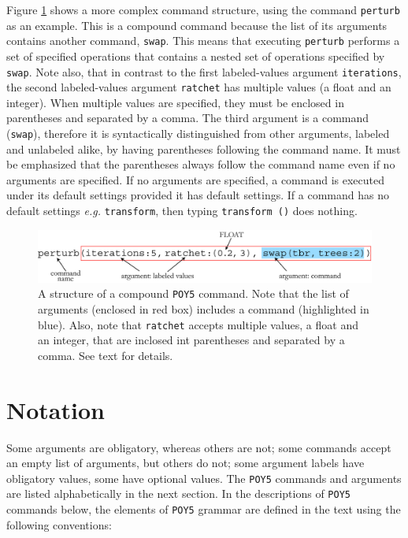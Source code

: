 \documentclass[11pt]{book}
\newcommand{\commandstyle}[1]{\texttt{#1}}
\newcommand{\poycommand}[1]{\commandstyle{#1}}
\newcommand{\poyargument}[1]{\commandstyle{#1}}
\newcommand{\poy}{\commandstyle{POY5}\xspace}
\begin{document}
Figure \ref{compositecommand} shows a more complex command structure, using the command 
\poycommand{perturb} as an example. This is a compound command because the list of its arguments 
contains another command, \poycommand{swap}. This means that executing \poycommand{perturb} 
performs a set of specified operations that contains a nested set of operations specified by \poycommand{swap}. 
Note also, that in contrast to the first labeled-values argument \poyargument{iterations}, the second 
labeled-values argument \poyargument{ratchet} has multiple values (a float and an integer). When 
multiple values are specified, they must be enclosed in parentheses and separated by a comma. The 
third argument is a command (\poycommand{swap}), therefore it is syntactically distinguished from 
other arguments, labeled and unlabeled alike, by having parentheses following the command name. It 
must be emphasized that the parentheses always follow the command name even if no arguments are 
specified. If no arguments are specified, a command is executed under its default settings provided it 
has default settings.  If a command has no default settings \emph{e.g.} \poycommand {transform}, then 
typing \poycommand{transform ()} does nothing. 

\begin{figure}[htbp]
   \centering
   \includegraphics[width=1.0\textwidth]{doc/figures/fig-poycommand2.jpg}
   \caption{A structure of a compound \poy command. Note that the list of arguments
   (enclosed in red box) includes a command (highlighted in blue). Also, note that
   \poyargument{ratchet} accepts multiple values, a float and an integer, that are inclosed int
   parentheses and separated by a comma. See text for details.}
   \label{compositecommand}
\end{figure}

\section{Notation}

Some arguments are obligatory, whereas others are not; some commands accept an
empty list of arguments, but others do not; some argument labels have
obligatory values, some have optional values. The \poy commands and arguments are listed alphabetically 
in the next section. In the descriptions of \poy commands below, the elements of \poy 
grammar are defined in the text using the following conventions:
\end{document}

